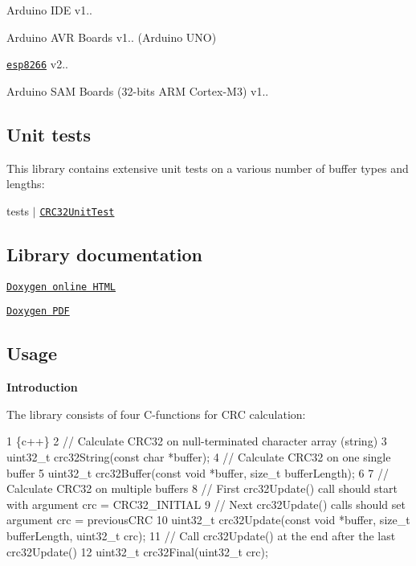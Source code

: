 \begin{DoxyItemize}
\item Arduino I\+DE v1..
\item Arduino A\+VR Boards v1.. (Arduino U\+NO)
\item \href{http://arduino.esp8266.com/stable/package_esp8266com_index.json}{\tt esp8266} v2..
\item Arduino S\+AM Boards (32-\/bits A\+RM Cortex-\/\+M3) v1..
\end{DoxyItemize}

\subsection*{Unit tests}

This library contains extensive unit tests on a various number of buffer types and lengths\+:


\begin{DoxyItemize}
\item tests $\vert$ \href{https://github.com/Erriez/ErriezCRC32/blob/master/examples/CRC32UnitTest/CRC32UnitTest.ino}{\tt C\+R\+C32\+Unit\+Test}
\end{DoxyItemize}

\subsection*{Library documentation}


\begin{DoxyItemize}
\item \href{https://erriez.github.io/ErriezCRC32}{\tt Doxygen online H\+T\+ML}
\item \href{https://github.com/Erriez/ErriezCRC32/raw/gh-pages/latex/ErriezCRC32.pdf}{\tt Doxygen P\+DF}
\end{DoxyItemize}

\subsection*{Usage}

{\bfseries Introduction}

The library consists of four C-\/functions for C\+RC calculation\+:


\begin{DoxyCode}
1 \{c++\}
2 // Calculate CRC32 on null-terminated character array (string)
3 uint32\_t crc32String(const char *buffer);
4 // Calculate CRC32 on one single buffer
5 uint32\_t crc32Buffer(const void *buffer, size\_t bufferLength);
6 
7 // Calculate CRC32 on multiple buffers
8 // First crc32Update() call should start with argument crc = CRC32\_INITIAL
9 // Next crc32Update() calls should set argument crc = previousCRC
10 uint32\_t crc32Update(const void *buffer, size\_t bufferLength, uint32\_t crc);
11 // Call crc32Update() at the end after the last crc32Update()
12 uint32\_t crc32Final(uint32\_t crc);
\end{DoxyCode}


